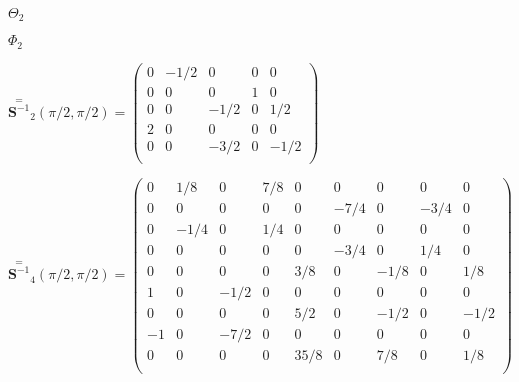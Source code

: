 \documentclass[twoside]{article}
\def\lthtmlcheckvsize{\ifdim\ht\sizebox<\vsize 
  \ifdim\wd\sizebox<\hsize\expandafter\hfill\fi \expandafter\vfill
  \else\expandafter\vss\fi}%
\begin{document}
{\newpage\clearpage
{}%
$\Theta_2$%
\lthtmlindisplaymathZ
\lthtmlcheckvsize\clearpage}

{\newpage\clearpage
{}%
$\Phi_2$%
\lthtmlindisplaymathZ
\lthtmlcheckvsize\clearpage}

{\newpage\clearpage
{}%
$\displaystyle
 \stackrel{=}{\mathbf S^{-1}}_2(\pi/2,\pi/2) = \left(
\begin{array}{ccccc}
 0 & -1/2 &    0 &    0 &    0 \\
 0 &    0 &    0 &    1 &    0 \\
 0 &    0 & -1/2 &    0 &  1/2 \\
 2 &    0 &    0 &    0 &    0 \\
 0 &    0 & -3/2 &    0 & -1/2 \\
\end{array} \right)
$%
\lthtmlindisplaymathZ
\lthtmlcheckvsize\clearpage}

{\newpage\clearpage
{}%
$\displaystyle
 \stackrel{=}{\mathbf S^{-1}}_4(\pi/2,\pi/2) = \left(
\begin{array}{ccccccccc}
 0 &  1/8 &    0 &  7/8 &    0 &    0 &    0 &    0 &    0 \\
 0 &    0 &    0 &    0 &    0 & -7/4 &    0 & -3/4 &    0 \\
 0 & -1/4 &    0 &  1/4 &    0 &    0 &    0 &    0 &    0 \\
 0 &    0 &    0 &    0 &    0 & -3/4 &    0 &  1/4 &    0 \\
 0 &    0 &    0 &    0 &  3/8 &    0 & -1/8 &    0 &  1/8 \\
 1 &    0 & -1/2 &    0 &    0 &    0 &    0 &    0 &    0 \\
 0 &    0 &    0 &    0 &  5/2 &    0 & -1/2 &    0 & -1/2 \\
-1 &    0 & -7/2 &    0 &    0 &    0 &    0 &    0 &    0 \\
 0 &    0 &    0 &    0 & 35/8 &    0 &  7/8 &    0 &  1/8 \\
\end{array} \right)
$%
\lthtmlindisplaymathZ
\lthtmlcheckvsize\clearpage}
\end{document}
